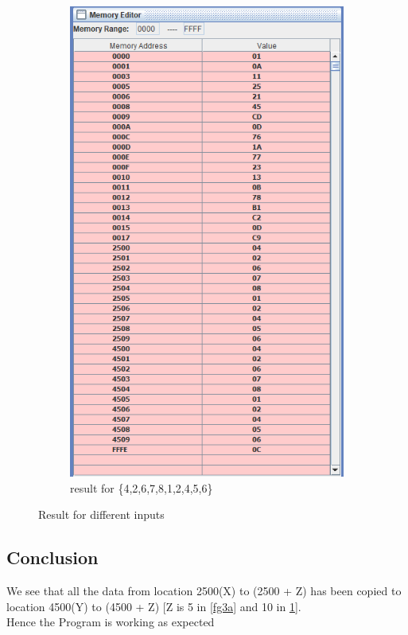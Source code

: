 \documentclass[a4paper]{article} %
\begin{document}
\begin{figure}[h!]
        \begin{subfigure}[b]{0.49\linewidth}
            \centering
            \includegraphics[width=\linewidth]{Assignment 2/1_Move Blocks/10 data copy.png}
            \caption{result for \{4,2,6,7,8,1,2,4,5,6\}}
            \label{fg3b}
        \end{subfigure}
        \caption{Result for different inputs}
        \label{fg3}
    \end{figure}
    \subsection{Conclusion}
        We see that all the data from location 2500(X) to (2500 + Z) has been copied to location 4500(Y) to (4500 + Z) [Z is 5 in \ref{fg3a} and 10 in \ref{fg3b}].\\
        Hence the Program is working as expected
\newpage
\end{document}
